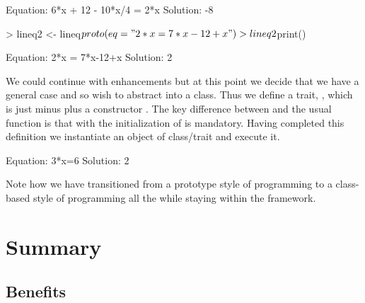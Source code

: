 \documentclass{Z}
\begin{document}
\begin{Schunk}
\begin{Soutput}
Equation: 6*x + 12 - 10*x/4 = 2*x Solution: -8 
\end{Soutput}
\begin{Sinput}
> lineq2 <- lineq$proto(eq = "2*x = 7*x-12+x")
> lineq2$print()
\end{Sinput}
\begin{Soutput}
Equation: 2*x = 7*x-12+x Solution: 2 
\end{Soutput}
\end{Schunk}

We could continue with enhancements but at this point we decide that we
have a general case and so wish
to abstract  into a class.  Thus we define a trait,
, which is just  minus  plus
a constructor .  The key difference between 
and the usual  function
is that with  the initialization of  is mandatory.
Having completed this definition
we instantiate an object of
class/trait  and execute it.

\begin{Schunk}
\begin{Soutput}
Equation: 3*x=6 Solution: 2 
\end{Soutput}
\end{Schunk}

Note how we have transitioned from a prototype style of programming
to a class-based style of programming all the while staying within
the  framework.

\section{Summary} \label{sec:summary}

\subsection{Benefits}
\end{document}
